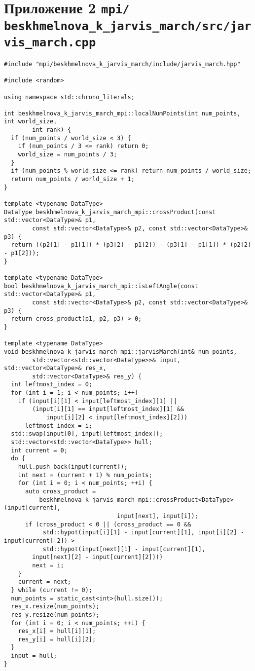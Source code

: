 \documentclass[a4paper,12pt]{article}
\begin{document}
\newpage

\section{Приложение 2 \texttt{mpi/ beskhmelnova\_k\_jarvis\_march/src/jarvis\_march.cpp}}
{\footnotesize
\begin{lstlisting}
#include "mpi/beskhmelnova_k_jarvis_march/include/jarvis_march.hpp"

#include <random>

using namespace std::chrono_literals;

int beskhmelnova_k_jarvis_march_mpi::localNumPoints(int num_points, int world_size, 
		int rank) {
  if (num_points / world_size < 3) {
    if (num_points / 3 <= rank) return 0;
    world_size = num_points / 3;
  }
  if (num_points % world_size <= rank) return num_points / world_size;
  return num_points / world_size + 1;
}

template <typename DataType>
DataType beskhmelnova_k_jarvis_march_mpi::crossProduct(const std::vector<DataType>& p1, 
		const std::vector<DataType>& p2, const std::vector<DataType>& p3) {
  return ((p2[1] - p1[1]) * (p3[2] - p1[2]) - (p3[1] - p1[1]) * (p2[2] - p1[2]));
}

template <typename DataType>
bool beskhmelnova_k_jarvis_march_mpi::isLeftAngle(const std::vector<DataType>& p1, 
		const std::vector<DataType>& p2, const std::vector<DataType>& p3) {
  return cross_product(p1, p2, p3) > 0;
}

template <typename DataType>
void beskhmelnova_k_jarvis_march_mpi::jarvisMarch(int& num_points, 
		std::vector<std::vector<DataType>>& input, std::vector<DataType>& res_x, 
		std::vector<DataType>& res_y) {
  int leftmost_index = 0;
  for (int i = 1; i < num_points; i++)
    if (input[i][1] < input[leftmost_index][1] ||
        (input[i][1] == input[leftmost_index][1] && 
			input[i][2] < input[leftmost_index][2]))
      leftmost_index = i;
  std::swap(input[0], input[leftmost_index]);
  std::vector<std::vector<DataType>> hull;
  int current = 0;
  do {
    hull.push_back(input[current]);
    int next = (current + 1) % num_points;
    for (int i = 0; i < num_points; ++i) {
      auto cross_product =
          beskhmelnova_k_jarvis_march_mpi::crossProduct<DataType>(input[current], 
								input[next], input[i]);
      if (cross_product < 0 || (cross_product == 0 &&
           std::hypot(input[i][1] - input[current][1], input[i][2] - input[current][2]) >
           std::hypot(input[next][1] - input[current][1], 
		input[next][2] - input[current][2])))
        next = i;
    }
    current = next;
  } while (current != 0);
  num_points = static_cast<int>(hull.size());
  res_x.resize(num_points);
  res_y.resize(num_points);
  for (int i = 0; i < num_points; ++i) {
    res_x[i] = hull[i][1];
    res_y[i] = hull[i][2];
  }
  input = hull;
}


\end{lstlisting}}
\end{document}
